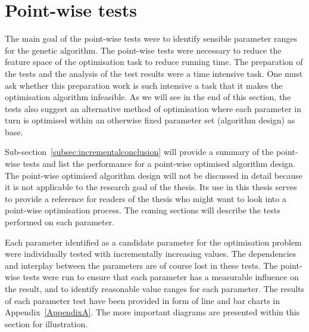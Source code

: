 

\section{Point-wise tests}

The main goal of the point-wise tests were to identify sensible parameter ranges for the genetic algorithm. The point-wise tests were necessary to reduce the feature space of the optimisation task to reduce running time. The preparation of the tests and the analysis of the test results were a time intensive task. One must ask whether this preparation work is such intensive a task that it makes the optimisation algorithm infeasible. As we will see in the end of this section, the tests also suggest an alternative method of optimisation where each parameter in turn is optimised within an otherwise fixed parameter set (algorithm design) as base.

Sub-section~\ref{subsec:incrementalconclusion} will provide a summary of the point-wise tests and list the performance for a point-wise optimised algorithm design. The point-wise optimised algorithm design will not be discussed in detail because it is not applicable to the research goal of the thesis. Its use in this thesis serves to provide a reference for readers of the thesis who might want to look into a point-wise optimisation process. The coming sections will describe the tests performed on each parameter.

Each parameter identified as a candidate parameter for the optimisation problem were individually tested with incrementally increasing values. The dependencies and interplay between the parameters are of course lost in these tests. The point-wise tests were run to ensure that each parameter has a measurable influence on the result, and to identify reasonable value ranges for each parameter. The results of each parameter test have been provided in form of line and bar charts in Appendix~\ref{AppendixA}. The more important diagrams are presented within this section for illustration.


